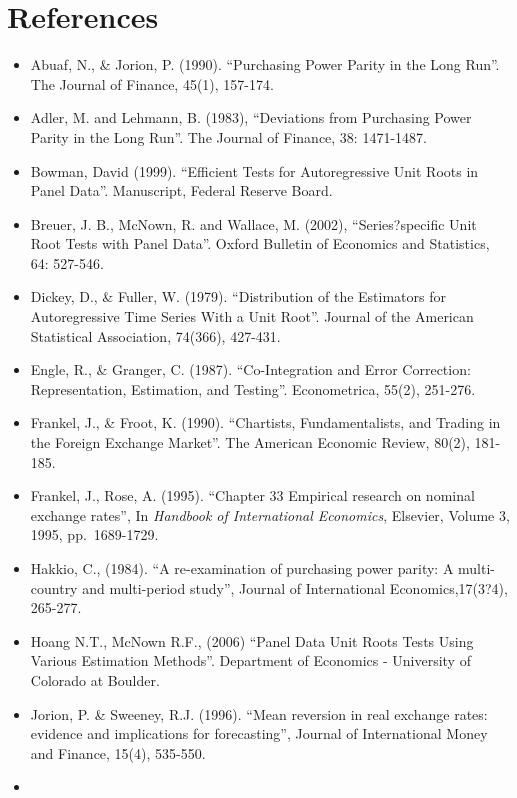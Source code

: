 \documentclass[]{article}
\begin{document}
\hypertarget{references}{%
\section{References}\label{references}}

\begin{itemize}
\item
  Abuaf, N., \& Jorion, P. (1990). ``Purchasing Power Parity in the Long Run''. The Journal of Finance, 45(1), 157-174.
\item
  Adler, M. and Lehmann, B. (1983), ``Deviations from Purchasing Power Parity in the Long Run''. The Journal of Finance, 38: 1471-1487.
\item
  Bowman, David (1999). ``Efficient Tests for Autoregressive Unit Roots in Panel Data''. Manuscript, Federal Reserve Board.
\item
  Breuer, J. B., McNown, R. and Wallace, M. (2002), ``Series?specific Unit Root Tests with Panel Data''. Oxford Bulletin of Economics and Statistics, 64: 527-546.
\item
  Dickey, D., \& Fuller, W. (1979). ``Distribution of the Estimators for Autoregressive Time Series With a Unit Root''. Journal of the American Statistical Association, 74(366), 427-431.
\item
  Engle, R., \& Granger, C. (1987). ``Co-Integration and Error Correction: Representation, Estimation, and Testing''. Econometrica, 55(2), 251-276.
\item
  Frankel, J., \& Froot, K. (1990). ``Chartists, Fundamentalists, and Trading in the Foreign Exchange Market''. The American Economic Review, 80(2), 181-185.
\item
  Frankel, J., Rose, A. (1995). ``Chapter 33 Empirical research on nominal exchange rates'', In \emph{Handbook of International Economics}, Elsevier, Volume 3, 1995, pp.~1689-1729.
\item
  Hakkio, C., (1984). ``A re-examination of purchasing power parity: A multi-country and multi-period study'', Journal of International Economics,17(3?4), 265-277.
\item
  Hoang N.T., McNown R.F., (2006) ``Panel Data Unit Roots Tests Using Various Estimation Methods''. Department of Economics - University of Colorado at Boulder.
\item
  Jorion, P. \& Sweeney, R.J. (1996). ``Mean reversion in real exchange rates: evidence and implications for forecasting'', Journal of International Money and Finance, 15(4), 535-550.
\item

\end{itemize}
\end{document}
